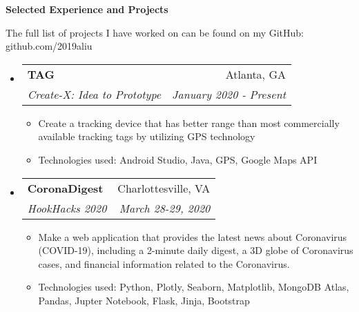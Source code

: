 \documentclass[letterpaper,10pt]{article}
\makeatletter
\newcommand{\resitem}[1]{\item #1 \vspace{-2pt}}
\newcommand{\resheading}[1]{{\large \colorbox{mygrey}{\begin{minipage}{\textwidth}{\textbf{#1 \vphantom{p\^{E}}}}\end{minipage}}}}
\newcommand{\ressubheading}[4]{
\begin{tabular*}{7.0in}{l@{\extracolsep{\fill}}r}
		\textbf{#1} & #2 \\
		\textit{#3} & \textit{#4} \\
\end{tabular*}\vspace{-6pt}}
\makeatother
\begin{document}
\resheading{Selected Experience and Projects}

\vspace{1em}
The full list of projects I have worked on can be found on my GitHub: github.com/2019aliu

\begin{itemize}
\item
    \ressubheading{TAG}{Atlanta, GA}{Create-X: Idea to Prototype}{January 2020 - Present}
    \begin{itemize}
        \resitem{Create a tracking device that has better range than most commercially available tracking tags by utilizing GPS technology}
        \resitem{Technologies used: Android Studio, Java, GPS, Google Maps API}
    \end{itemize}
\item
    \ressubheading{CoronaDigest}{Charlottesville, VA}{HookHacks 2020}{March 28-29, 2020}
    \begin{itemize}
        \resitem{Make a web application that provides the latest news about Coronavirus (COVID-19), including a 2-minute daily digest, a 3D globe of Coronavirus cases, and financial information related to the Coronavirus.}
        \resitem{Technologies used: Python, Plotly, Seaborn, Matplotlib, MongoDB Atlas, Pandas, Jupter Notebook, Flask, Jinja, Bootstrap}
    \end{itemize}

\end{itemize}
\end{document}
